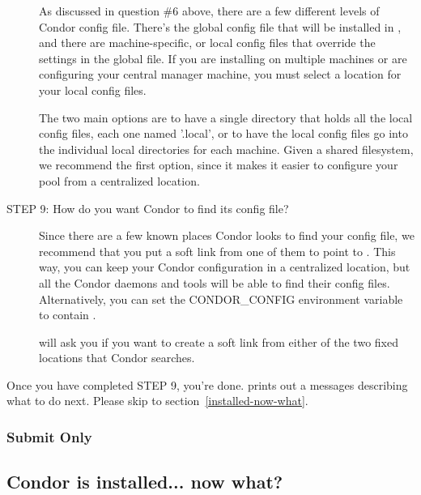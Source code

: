 \begin{description}
     As discussed in question \#6 above, there are a few different
     levels of Condor config file.  There's the global config file
     that will be installed in , and
     there are machine-specific, or local config files that override
     the settings in the global file.  If you are installing on
     multiple machines or are configuring your central manager
     machine, you must select a location for your local config files. 

     The two main options are to have a single directory that holds
     all the local config files, each one named '.local',
     or to have the local config files go into the individual local
     directories for each machine.  Given a shared filesystem, we
     recommend the first option, since it makes it easier to configure
     your pool from a centralized location.


\item[STEP 9: How do you want Condor to find its config file?]

     Since there are a few known places Condor looks to find your
     config file, we recommend that you put a soft link from one of
     them to point to .  This way, you
     can keep your Condor configuration in a centralized location, but
     all the Condor daemons and tools will be able to find their
     config files.  Alternatively, you can set the CONDOR\_CONFIG
     environment variable to contain .

      will ask you if you want to create a soft link
     from either of the two fixed locations that Condor searches.

\end{description}

Once you have completed STEP 9, you're done.   prints
out a messages describing what to do next.  Please skip to 
section~\ref{installed-now-what}.

\subsubsection{Submit Only}

\Todo

\subsection{\label{installed-now-what}Condor is installed... now what?}

